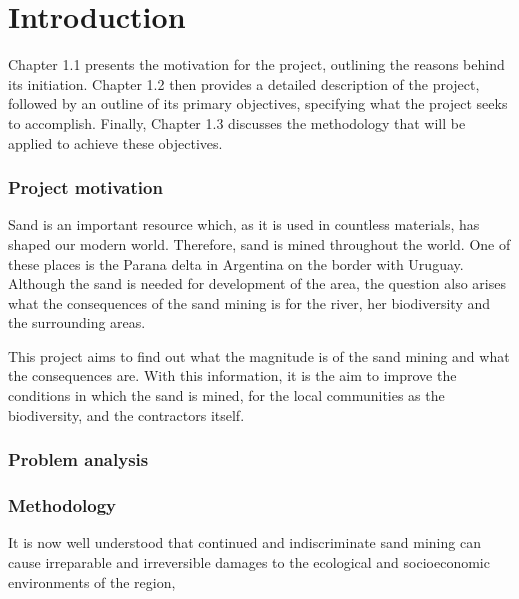 \chapter{Introduction}
\label{chapter:introduction}

Chapter 1.1 presents the motivation for the project, outlining the reasons behind its initiation. Chapter 1.2 then provides a detailed description of the project, followed by an outline of its primary objectives, specifying what the project seeks to accomplish. Finally, Chapter 1.3 discusses the methodology that will be applied to achieve these objectives.

\subsection{Project motivation}
Sand is an important resource which, as it is used in countless materials, has shaped our modern world. Therefore, sand is mined throughout the world. One of these places is the Parana delta in Argentina on the border with Uruguay. Although the sand is needed for development of the area, the question also arises what the consequences of the sand mining is for the river, her biodiversity and the surrounding areas. 

This project aims to find out what the magnitude is of the sand mining and what the consequences are. With this information, it is the aim to improve the conditions in which the sand is mined, for the local communities as the biodiversity, and the contractors itself.

\subsection{Problem analysis}

\subsection{Methodology}























It is now well understood that continued and indiscriminate sand mining can cause irreparable and irreversible damages to the ecological and socioeconomic environments of the region,

